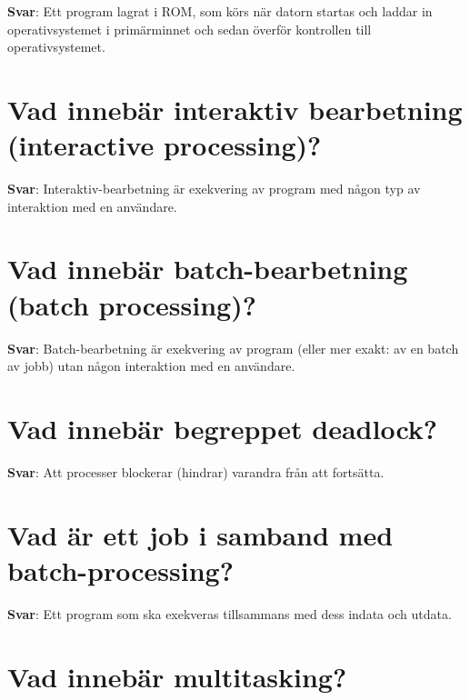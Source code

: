 \documentclass[a4paper,11pt,oneside]{book}
\begin{document}
\begin{sloppypar}
\label{q:125:sa:sv:True}

\textbf{Svar}: Ett program lagrat i ROM, som k\"ors n\"ar datorn startas och laddar in operativsystemet i prim\"arminnet och sedan \"overf\"or kontrollen till operativsystemet.



\section{Vad inneb\"ar interaktiv bearbetning (interactive processing)?}

\label{q:126:sa:sv:True}

\textbf{Svar}: Interaktiv-bearbetning \"ar exekvering av program med n\r{a}gon typ av interaktion med en anv\"andare.



\section{Vad inneb\"ar batch-bearbetning (batch processing)?}

\label{q:127:sa:sv:True}

\textbf{Svar}: Batch-bearbetning \"ar exekvering av program (eller mer exakt: av en batch av jobb) utan n\r{a}gon interaktion med en anv\"andare.



\section{Vad inneb\"ar begreppet deadlock?}

\label{q:129:sa:sv:True}

\textbf{Svar}: Att processer blockerar (hindrar) varandra fr\r{a}n att forts\"atta.



\section{Vad \"ar ett job i samband med batch-processing?}

\label{q:130:sa:sv:True}

\textbf{Svar}: Ett program som ska exekveras tillsammans med dess indata och utdata.



\section{Vad inneb\"ar multitasking?}


\end{sloppypar}
\end{document}

